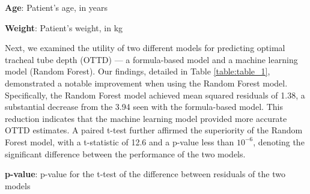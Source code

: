 \documentclass[11pt]{article}
\begin{document}
\begin{table}[h]
\caption{Descriptive statistics of age and weight, stratified by sex}
\label{table:table_0}
\begin{threeparttable}
\renewcommand{\TPTminimum}{\linewidth}
\begin{tablenotes}
\footnotesize
\item \textbf{Age}: Patient's age, in years
\item \textbf{Weight}: Patient's weight, in kg
\end{tablenotes}
\end{threeparttable}
\end{table}


Next, we examined the utility of two different models for predicting optimal tracheal tube depth (OTTD) --- a formula-based model and a machine learning model (Random Forest). Our findings, detailed in Table \ref{table:table_1}, demonstrated a notable improvement when using the Random Forest model. Specifically, the Random Forest model achieved mean squared residuals of 1.38, a substantial decrease from the 3.94 seen with the formula-based model. This reduction indicates that the machine learning model provided more accurate OTTD estimates. A paired t-test further affirmed the superiority of the Random Forest model, with a t-statistic of 12.6 and a p-value less than $10^{-6}$, denoting the significant difference between the performance of the two models.

\begin{table}[h]
\caption{Comparison of the performance of the machine learning model and the formula-based model for predicting OTTD}
\label{table:table_1}
\begin{threeparttable}
\renewcommand{\TPTminimum}{\linewidth}
\begin{tablenotes}
\footnotesize
\item \textbf{p-value}: p-value for the t-test of the difference between residuals of the two models
\end{tablenotes}
\end{threeparttable}
\end{table}
\end{document}
